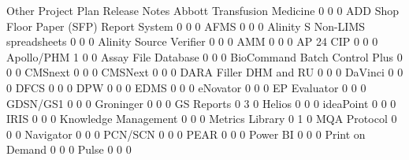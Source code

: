 \documentclass{article}
\begin{document}
\begin{Schunk}
\begin{Soutput}
                                           Other Project Plan Release Notes
  Abbott Transfusion Medicine                  0            0             0
  ADD Shop Floor Paper (SFP) Report System     0            0             0
  AFMS                                         0            0             0
  Alinity S Non-LIMS spreadsheets              0            0             0
  Alinity Source Verifier                      0            0             0
  AMM                                          0            0             0
  AP 24 CIP                                    0            0             0
  Apollo/PHM                                   1            0             0
  Assay File Database                          0            0             0
  BioCommand Batch Control Plus                0            0             0
  CMSnext                                      0            0             0
  CMSNext                                      0            0             0
  DARA Filler DHM and RU                       0            0             0
  DaVinci                                      0            0             0
  DFCS                                         0            0             0
  DPW                                          0            0             0
  EDMS                                         0            0             0
  eNovator                                     0            0             0
  EP Evaluator                                 0            0             0
  GDSN/GS1                                     0            0             0
  Groninger                                    0            0             0
  GS Reports                                   0            3             0
  Helios                                       0            0             0
  ideaPoint                                    0            0             0
  IRIS                                         0            0             0
  Knowledge Management                         0            0             0
  Metrics Library                              0            1             0
  MQA Protocol                                 0            0             0
  Navigator                                    0            0             0
  PCN/SCN                                      0            0             0
  PEAR                                         0            0             0
  Power BI                                     0            0             0
  Print on Demand                              0            0             0
  Pulse                                        0            0             0

\end{Soutput}
\end{Schunk}
\end{document}
